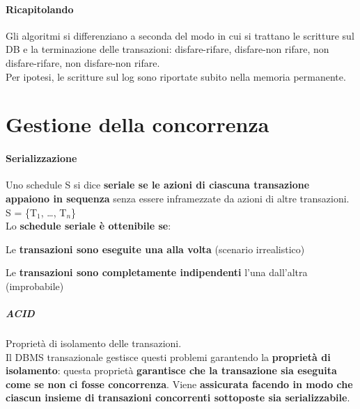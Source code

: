 \documentclass[10pt]{book}
\begin{document}
\paragraph{Ricapitolando} Gli algoritmi si differenziano a seconda del modo in cui si trattano le scritture sul DB e la terminazione delle transazioni: disfare-rifare, disfare-non rifare, non disfare-rifare, non disfare-non rifare.\\
Per ipotesi, le scritture sul log sono riportate subito nella memoria permanente.
\section{Gestione della concorrenza}
\paragraph{Serializzazione} Uno schedule S si dice \textbf{seriale se le azioni di ciascuna transazione appaiono in sequenza} senza essere inframezzate da azioni di altre transazioni.\\
S = \{T$_1$, \ldots, T$_n$\}\\
Lo \textbf{schedule seriale è ottenibile se}:
\begin{list}{}{}
	\item Le \textbf{transazioni sono eseguite una alla volta} (scenario irrealistico)
	\item Le \textbf{transazioni sono completamente indipendenti} l'una dall'altra (improbabile)
\end{list}
\subparagraph{ACID} Proprietà di isolamento delle transazioni.\\
Il DBMS transazionale gestisce questi problemi garantendo la \textbf{proprietà di isolamento}: questa proprietà \textbf{garantisce che la transazione sia eseguita come se non ci fosse concorrenza}. Viene \textbf{assicurata facendo in modo che ciascun insieme di transazioni concorrenti sottoposte sia serializzabile}.
\end{document}
